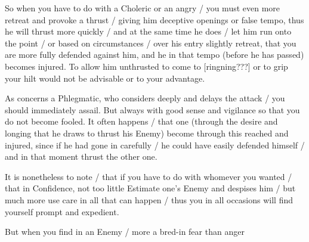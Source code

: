 
So when you have to do with a Choleric or an angry / you must even
more retreat and provoke a thrust / giving him deceptive openings or
false tempo, thus he will thrust more quickly / and at the same time
he does / let him run onto the point / or based on circumstances /
over his entry slightly retreat, that you are more fully defended
against him, and he in that tempo (before he has passed) becomes
injured. To allow him unthrusted to come to
[ringning???] or to grip
your hilt would not be advisable or to your advantage.


As concerns a Phlegmatic, who considers deeply and delays the attack /
you should immediately assail. But always with good sense and
vigilance so that you do not become fooled. It often happens / that
one (through the desire and longing that he draws to thrust his Enemy)
become through this reached and injured, since if he had gone in
carefully / he could have easily defended himself / and in that moment
thrust the other one.


It is nonetheless to note / that if you have to do with whomever you
wanted / that in Confidence, not too little Estimate one's Enemy and
despises him / but much more use care in all that can happen / thus
you in all occasions will find yourself prompt and expedient.


But when you find in an Enemy / more a bred-in fear than anger
